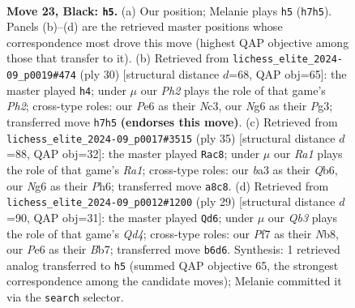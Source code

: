\documentclass[11pt]{article}
\begin{document}
\clearpage

\begin{figure}[p]\centering
\begin{subfigure}{0.46\textwidth}\centering
\resizebox{\linewidth}{!}{%
\newchessgame
\chessboard[
  setfen={r3r1k1/bp1b1ppp/pq2p1n1/8/3p2P1/BP5B/P2P1PQP/RN2RK2 b - - 3 23},
  showmover=false,
  pgfstyle=straightmove, color=movearrow, markmove={h7-h5}
]}
\caption{}
\end{subfigure}\hfill
\begin{subfigure}{0.46\textwidth}\centering
\resizebox{\linewidth}{!}{%
\newchessgame
\chessboard[
  setfen={r2qr1kb/pppn1p1p/2bp2pB/8/4P3/2N3P1/PPPQ1PBP/R3R1K1 w - - 4 16},
  showmover=false,
  pgfstyle=straightmove, color=movearrow, markmove={h2-h4}
]}
\caption{}
\end{subfigure}
\\[4pt]
\begin{subfigure}{0.46\textwidth}\centering
\resizebox{\linewidth}{!}{%
\newchessgame
\chessboard[
  setfen={r2r2k1/pp3pp1/1q3b1p/8/1n1pB3/1N3Q2/PPP2PPP/R3R1K1 b - - 4 18},
  showmover=false,
  pgfstyle=straightmove, color=movearrow, markmove={a8-c8}
]}
\caption{}
\end{subfigure}\hfill
\begin{subfigure}{0.46\textwidth}\centering
\resizebox{\linewidth}{!}{%
\newchessgame
\chessboard[
  setfen={rn2r1k1/pb2ppb1/1p4p1/3qp3/2Bp4/6BQ/PP1N1PP1/R3K1NR b KQ - 1 15},
  showmover=false,
  pgfstyle=straightmove, color=movearrow, markmove={d5-d6}
]}
\caption{}
\end{subfigure}
\caption{\textbf{Move 23, Black: \texttt{h5}.} (a) Our position; Melanie plays \texttt{h5} (\texttt{h7h5}). Panels (b)--(d) are the retrieved master positions whose correspondence most drove this move (highest QAP objective among those that transfer to it). (b) Retrieved from \texttt{lichess\_elite\_2024-09\_p0019\#474} (ply 30) [structural distance $d$=68, QAP obj=65]: the master played \texttt{h4}; under $\mu$ our \emph{Ph2} plays the role of that game's \emph{Ph2}; cross-type roles: our \emph{P}e6 as their \emph{N}c3, our \emph{N}g6 as their \emph{P}g3; transferred move \texttt{h7h5} \textbf{(endorses this move)}. (c) Retrieved from \texttt{lichess\_elite\_2024-09\_p0017\#3515} (ply 35) [structural distance $d$=88, QAP obj=32]: the master played \texttt{Rac8}; under $\mu$ our \emph{Ra1} plays the role of that game's \emph{Ra1}; cross-type roles: our \emph{b}a3 as their \emph{Q}b6, our \emph{N}g6 as their \emph{P}h6; transferred move \texttt{a8c8}. (d) Retrieved from \texttt{lichess\_elite\_2024-09\_p0012\#1200} (ply 29) [structural distance $d$=90, QAP obj=31]: the master played \texttt{Qd6}; under $\mu$ our \emph{Qb3} plays the role of that game's \emph{Qd4}; cross-type roles: our \emph{P}f7 as their \emph{N}b8, our \emph{P}e6 as their \emph{B}b7; transferred move \texttt{b6d6}. Synthesis: 1 retrieved analog transferred to \texttt{h5} (summed QAP objective 65, the strongest correspondence among the candidate moves); Melanie committed it via the \texttt{search} selector.}
\label{fig:thought-m45}
\end{figure}
\end{document}

